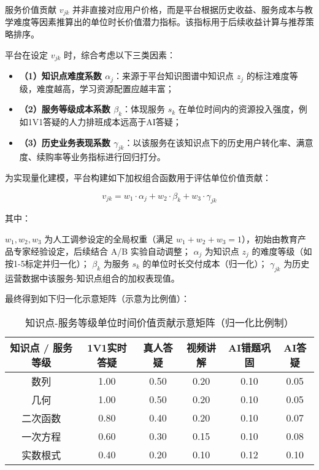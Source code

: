 \vspace{0.5em}
服务价值贡献 $v_{jk}$ 并非直接对应用户价格，而是平台根据历史收益、服务成本与教学难度等因素推算出的单位时长价值潜力指标。该指标用于后续收益计算与推荐策略排序。

平台在设定 $v_{jk}$ 时，综合考虑以下三类因素：

\begin{itemize}
\item \textbf{（1）知识点难度系数 $\alpha_j$}：来源于平台知识图谱中知识点 $z_j$ 的标注难度等级，难度越高，学习资源配置应越丰富；
\item \textbf{（2）服务等级成本系数 $\beta_k$}：体现服务 $s_k$ 在单位时间内的资源投入强度，例如1V1答疑的人力排班成本远高于AI答疑；
\item \textbf{（3）历史业务表现系数 $\gamma_{jk}$}：以该服务在该知识点下的历史用户转化率、满意度、续购率等业务指标进行回归打分。
\end{itemize}

为实现量化建模，平台构建如下加权组合函数用于评估单位价值贡献：

\begin{equation}
v_{jk} = w_1 \cdot \alpha_j + w_2 \cdot \beta_k + w_3 \cdot \gamma_{jk}
\end{equation}

其中：

$w_1, w_2, w_3$ 为人工调参设定的全局权重（满足 $w_1 + w_2 + w_3 = 1$），初始由教育产品专家经验设定，后续结合 A/B 实验自动调整；
$\alpha_j$ 为知识点 $z_j$ 的难度等级（如按1-5标定并归一化）；
$\beta_k$ 为服务 $s_k$ 的单位时长交付成本（归一化）；
$\gamma_{jk}$ 为历史运营数据中该服务-知识点组合的加权表现值。


\vspace{0.5em}
最终得到如下归一化示意矩阵（示意为比例值）：

\begin{table}[!h]
\centering
\caption{知识点-服务等级单位时间价值贡献示意矩阵（归一化比例制）}
\begin{tabular}{c c c c c c}
\toprule
知识点 / 服务等级 & 1V1实时答疑 & 真人答疑 & 视频讲解 & AI错题巩固 & AI答疑 \\
\midrule
数列 & 1.00 & 0.50 & 0.20 & 0.10 & 0.05 \\
几何 & 1.00 & 0.50 & 0.20 & 0.10 & 0.05 \\
二次函数 & 0.80 & 0.40 & 0.20 & 0.10 & 0.07 \\
一次方程 & 0.60 & 0.30 & 0.15 & 0.10 & 0.08 \\
实数根式 & 0.40 & 0.20 & 0.10 & 0.12 & 0.10 \\
\bottomrule
\end{tabular}
\label{tab:value_contribution_matrix}
\end{table}

